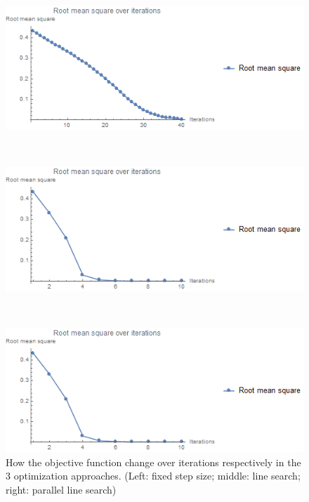 \begin{figure}
	\centering
	\begin{minipage}{.33\textwidth}
		\includegraphics[width=1\linewidth]{images/nucleon_strong_red_rms_fixed}
	\end{minipage}~
	\begin{minipage}{.33\textwidth}
		\includegraphics[width=1\linewidth]{images/nucleon_strong_red_rms_linesearch}
	\end{minipage}~
	\begin{minipage}{.33\textwidth}
		\includegraphics[width=1\linewidth]{images/nucleon_strong_red_rms_parallelsearch}
	\end{minipage}
	\caption{How the objective function change over iterations respectively in the 3 optimization approaches. (Left: fixed step size; middle: line search; right: parallel line search)}
	\label{fig:nucleon_strong_red_rms}
\end{figure}

